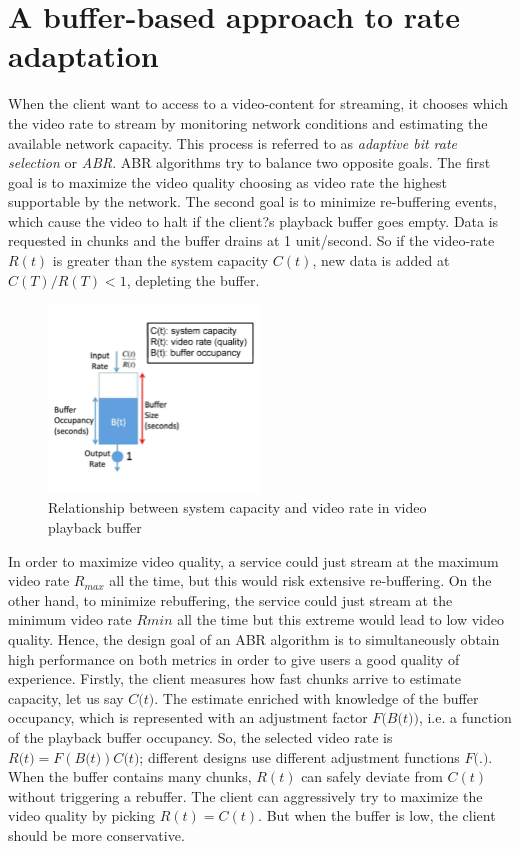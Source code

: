 \documentclass[a4paper]{report}
\begin{document}
\chapter{A buffer-based approach to rate adaptation}
When the client want to access to a video-content for streaming, it chooses which the video rate to stream by monitoring network conditions and estimating the available network capacity. This process is referred to as \textit{adaptive bit rate selection} or \textit{ABR}.
ABR algorithms try to balance two opposite goals. The first goal is  to maximize the video quality choosing as video rate the highest supportable by the network. The second goal is to minimize re-buffering events, which cause the video to halt if the client?s playback buffer goes empty. Data is requested in chunks and the buffer drains at 1 unit/second. So if the video-rate $R(t)$ is greater than the system capacity $C(t)$, new data is added at $C(T)/R(T)<1$, depleting the buffer.
\begin{figure}[H]
  \begin{center}
    \includegraphics[width=0.5\textwidth]{buffer}
  \end{center}
  \caption{Relationship between system capacity and video rate in video playback buffer ~\citep{Huang:2014:BAR:2740070.2626296} }\label{buffer}
\end{figure}

In order to maximize video quality, a service could just stream at the maximum video rate $R_{max}$ all the time, but this would risk extensive re-buffering. On the other hand, to minimize rebuffering, the service could just stream at the minimum video rate $Rmin$ all the time but this extreme would lead to low video quality. Hence, the design goal of an ABR algorithm is to simultaneously obtain high performance on both metrics in order to give users a good quality of experience.
Firstly, the client measures how fast chunks arrive to estimate capacity, let us say $C\textit{(}t\textit{)}$. The estimate enriched with knowledge of the buffer occupancy, which is represented with an  adjustment factor  $F\textit{(}B\textit{(}t\textit{)}\textit{)}$, i.e. a function of the playback buffer occupancy. So, the selected video rate is $R\textit{(}t\textit{)} = F(B\textit{(}t\textit{)})C\textit{(}t\textit{)}$; different designs use different adjustment functions $F\textit{(}.\textit{)}$.
When the buffer contains many chunks, $R(t)$ can safely deviate from $C(t)$ without triggering a rebuffer. The client can aggressively try to maximize the video quality by picking $R(t) = C(t)$. But when the buffer is low, the client should be more conservative.
\end{document}
